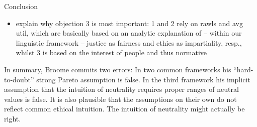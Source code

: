 Conclusion 
\begin{comment}
\begin{flushleft} \tablefirsthead{} \tablehead{} \tabletail{} \tablelasttail{} \begin{supertabular}{|m{2.552cm}|m{2.552cm}|m{2.552cm}|m{2.553cm}|m{2.552cm}|m{2.55cm}|} \hline Contractarianism & Average Utilitarianism & Difference Principle & Note & Example & Compatible w/ neutrality\\\hline [2705?] & [2705?] & [274C?] & Utilitarianism with contractarian justification & \label{ref:RNDaJD6e3IOYj}Harsanyi 1955* & [2705?]\\\hline [2705?] & [274C?] & [2705?] & Difference principle with contractarian justification & \label{ref:RNDS2MPdVpPtJ}Rawls 2005 & [2705?]\\\hline [2705?] & [274C?] & [274C?] & Contractarianism with other or no welfare function & \label{ref:RNDlVodR5UJmv}Stemmer 2000 & [2705?]\\\hline [274C?] & [2705?] & [274C?] & Utilitarianism with other justification & \label{ref:RNDoJYZrQAT8L}Broome 2004 & [2705?]\\\hline [274C?] & [274C?] & [2705?] & Difference principle with other justification & cf. \label{ref:RNDUfrSm8hSWB}Pomerenke 2017** & [2705?]\\\hline [274C?] & [274C?] & [274C?] & Other moral framework & – & [2753?]\\\hline \end{supertabular} \end{flushleft} 

\bigskip 

* in an interpretation of ??? (maybe it was in SEP) 

** better replace by someone else. maybe edgeworth or so 
\end{comment}
\begin{itemize} \item explain why objection 3 is most important: 1 and 2 rely on rawls and avg util, which are basically based on an analytic explanation of – within our linguistic framework – justice as fairness and ethics as impartiality, resp., whilst 3 is based on the interest of people and thus normative \end{itemize} In summary, Broome commits two errors: In two common frameworks his “hard-to-doubt” strong Pareto assumption is false. In the third framework his implicit assumption that the intuition of neutrality requires proper ranges of neutral values is false. It is also plausible that the assumptions on their own do not reflect common ethical intuition. The intuition of neutrality might actually be right. 

